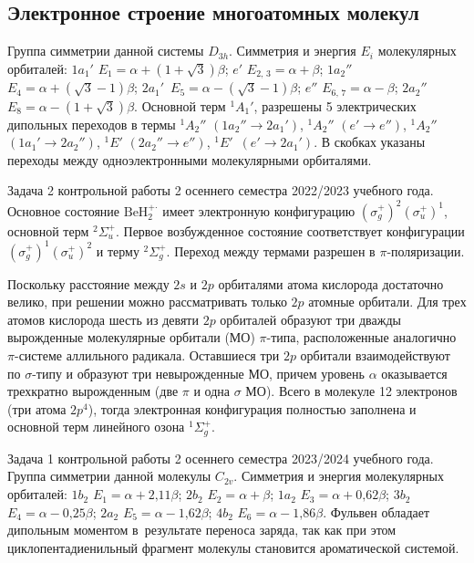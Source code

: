 \subsection{Электронное строение многоатомных молекул}
 Группа симметрии данной системы $D_{3h}$. Симметрия и энергия $E_i$ молекулярных орбиталей: $1a_1'$ $E_1=\alpha+(1+\sqrt3)\beta$; $e'$ $E_{2,\,3}=\alpha+\beta$; $1a_2''$ $E_4=\alpha+(\sqrt3-1)\beta$; $2a_1'$~$E_5=\alpha-(\sqrt3-1)\beta$; $e''$ $E_{6,\,7}=\alpha-\beta$; $2a_2''$~$E_8=\alpha-(1+\sqrt3)\beta$. Основной терм $^1A_1'$, разрешены 5 электрических дипольных переходов в термы $^1A_2''$ $(1a_2'' \rightarrow 2a_1')$, $^1A_2''$ $(e' \rightarrow e'')$, $^1A_2''$ $(1a_1' \rightarrow 2a_2'')$, $^1E'$ $(2a_2'' \rightarrow e'')$, $^1E'$~$(e' \rightarrow 2a_1')$. В скобках указаны переходы между одноэлектронными молекулярными орбиталями.\par
{} Задача 2 контрольной работы 2 осеннего семестра 2022/2023 учебного года. Основное состояние $\text{BeH}_2^{+\boldsymbol{\cdot}}$ имеет электронную конфигурацию $(\sigma_g^+)^2 (\sigma_u^+)^1$, основной терм $^2\Sigma_u^+$. Первое возбужденное состояние соответствует конфигурации $(\sigma_g^+)^1 (\sigma_u^+)^2$ и терму $^2\Sigma_g^+$. Переход между термами разрешен в $\pi$-поляризации.\par
{} Поскольку расстояние между $2s$ и $2p$ орбиталями атома кислорода достаточно велико, при решении можно рассматривать только $2p$ атомные орбитали. Для трех атомов кислорода шесть из девяти $2p$ орбиталей образуют три дважды вырожденные молекулярные орбитали (МО) $\pi$-типа, расположенные аналогично $\pi$-системе аллильного радикала. Оставшиеся три $2p$ орбитали взаимодействуют по $\sigma$-типу и образуют три невырожденные МО, причем уровень $\alpha$ оказывается трехкратно вырожденным (две $\pi$ и одна $\sigma$ МО). Всего в молекуле 12 электронов (три атома $2p^4$), тогда электронная конфигурация полностью заполнена и основной терм линейного озона $^1\Sigma_g^+$. \par
{} Задача 1 контрольной работы 2 осеннего семестра 2023/2024 учебного года. Группа симметрии данной молекулы $C_{2v}$. Симметрия и энергия молекулярных орбиталей: $1b_2$ $E_1=\alpha+2\text{,}11\beta$; $2b_2$ $E_2=\alpha+\beta$; $1a_2$ $E_3=\alpha+0\text{,}62\beta$; $3b_2$ $E_4=\alpha-0\text{,}25\beta$; $2a_2$ $E_5=\alpha-1\text{,}62\beta$; $4b_2$ $E_6=\alpha-1\text{,}86\beta$. Фульвен обладает дипольным моментом в~результате переноса заряда, так как при этом циклопентадиенильный фрагмент молекулы становится ароматической системой.\par
